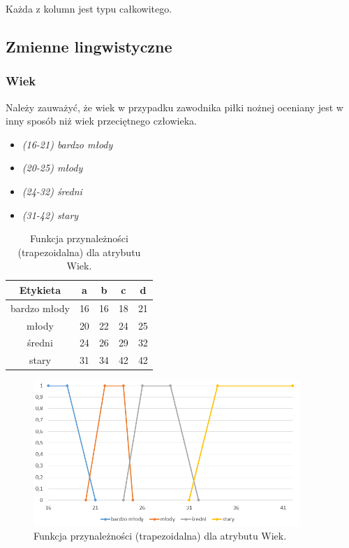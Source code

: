 \documentclass{classrep}
\begin{document}
	Każda z kolumn jest typu całkowitego.
	\newpage
	\subsection{Zmienne lingwistyczne}
	\subsubsection{Wiek}
	Należy zauważyć, że wiek w przypadku zawodnika piłki nożnej oceniany jest w inny sposób niż wiek przeciętnego człowieka.
	\begin{itemize}
		\item \textsl{(16-21) bardzo młody}
		\item \textsl{(20-25) młody}
		\item \textsl{(24-32) średni}
		\item \textsl{(31-42) stary}
	\end{itemize}
	
	\begin{table}[h!]
		\centering
		\begin{tabular} {c c c c c}
			\hline
			\textbf{Etykieta} & \textbf{a} & \textbf{b} & \textbf{c} & \textbf{d} \\ [0.5ex] 
			\hline	
			\hline 
			bardzo młody & 16 & 16 & 18 & 21  \\
			młody & 20 & 22 & 24 & 25  \\
			średni & 24 & 26 & 29 & 32  \\
			stary & 31 & 34 & 42 & 42  \\
			\hline
		\end{tabular}
		\caption{Funkcja przynależności (trapezoidalna) dla atrybutu Wiek. }
		\label{tabelaWiek}
	\end{table}

	\begin{figure}[h!]
		\centering
		\includegraphics[width=0.9\textwidth]{zmienne/1.png}
		\caption{Funkcja przynależności (trapezoidalna) dla atrybutu Wiek.}
		\label{wykresWiek}
	\end{figure}
	
\end{document}
